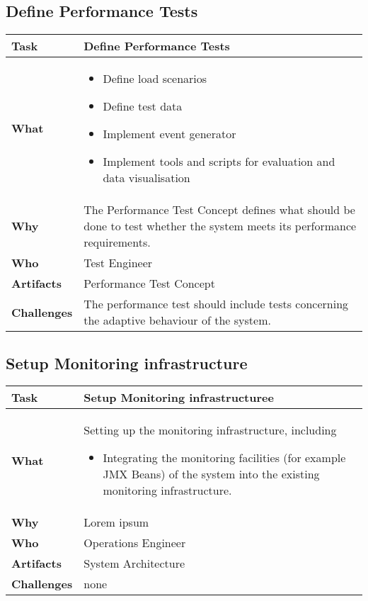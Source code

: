 \subsection{Define Performance Tests}
\begin{minipage}{\textwidth}
 \label{table:ch6_Task_Define_Performance_Tests}
\begin{tabular}
	{|m{3cm}|m{10cm}|} \hline \bfseries Task & Define Performance Tests\\
	\hline \bfseries What &
	\begin{itemize}
		\item Define load scenarios
		\item Define test data
		\item Implement event generator
		\item Implement tools and scripts for evaluation and data visualisation
	\end{itemize}
	\\
	\hline \bfseries Why & The Performance Test Concept defines what should be done to test whether the system meets its performance requirements.\\
	\hline \bfseries Who & Test Engineer\\
	\hline \bfseries Artifacts & Performance Test Concept\\
	\hline \bfseries Challenges & The performance test should include tests concerning the adaptive behaviour of the system.\\
	\hline 
\end{tabular}
\end{minipage}

\subsection{Setup Monitoring infrastructure}
\begin{minipage}{\textwidth}
 \label{table:ch6_Task_Setup_Monitoring_infrastructure}
\begin{tabular}
	{|m{3cm}|m{10cm}|} \hline \bfseries Task & Setup Monitoring infrastructuree\\
	\hline \bfseries What & Setting up the monitoring infrastructure, including
	\begin{itemize}
		\item Integrating the monitoring facilities (for example \ac{JMX} Beans) of the system into the existing monitoring infrastructure.
	\end{itemize}
	\\
	\hline \bfseries Why & Lorem ipsum\\
	\hline \bfseries Who & Operations Engineer\\
	\hline \bfseries Artifacts & System Architecture\\
	\hline \bfseries Challenges & none\\
	\hline 
\end{tabular}
\end{minipage}

